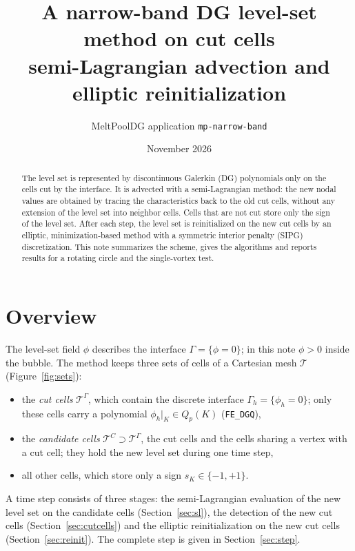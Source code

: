 \documentclass[11pt,a4paper]{article}
\title{A narrow-band DG level-set method on cut cells\\[2pt]
\large semi-Lagrangian advection and elliptic reinitialization}
\author{MeltPoolDG \textendash{} application \texttt{mp-narrow-band}}
\date{November 2026}
\newcommand{\T}{\mathcal{T}}
\begin{document}
\maketitle

\begin{abstract}
\noindent
The level set is represented by discontinuous Galerkin (DG) polynomials only on the cells cut by
the interface. It is advected with a semi-Lagrangian method: the new nodal values are obtained by
tracing the characteristics back to the old cut cells, without any extension of the level set into
neighbor cells. Cells that are not cut store only the sign of the level set. After each step, the
level set is reinitialized on the new cut cells by an elliptic, minimization-based method with a
symmetric interior penalty (SIPG) discretization. This note summarizes the scheme, gives the
algorithms and reports results for a rotating circle and the single-vortex test.
\end{abstract}

\section{Overview}
\label{sec:overview}

The level-set field $\phi$ describes the interface $\Gamma = \{\phi = 0\}$; in this note
$\phi > 0$ inside the bubble. The method keeps three sets of cells of a Cartesian mesh $\T$
(Figure~\ref{fig:sets}):
\begin{itemize}
  \item the \emph{cut cells} $\T^{\Gamma}$, which contain the discrete interface
  $\Gamma_h = \{\phi_h = 0\}$; only these cells carry a polynomial $\phi_h|_K \in Q_p(K)$
  (\texttt{FE\_DGQ}),
  \item the \emph{candidate cells} $\T^{C} \supset \T^{\Gamma}$, the cut cells and the cells sharing
  a vertex with a cut cell; they hold the new level set during one time step,
  \item all other cells, which store only a sign $s_K \in \{-1, +1\}$.
\end{itemize}
A time step consists of three stages: the semi-Lagrangian evaluation of the new level set on the
candidate cells (Section~\ref{sec:sl}), the detection of the new cut cells
(Section~\ref{sec:cutcells}) and the elliptic reinitialization on the new cut cells
(Section~\ref{sec:reinit}). The complete step is given in Section~\ref{sec:step}.
\end{document}
